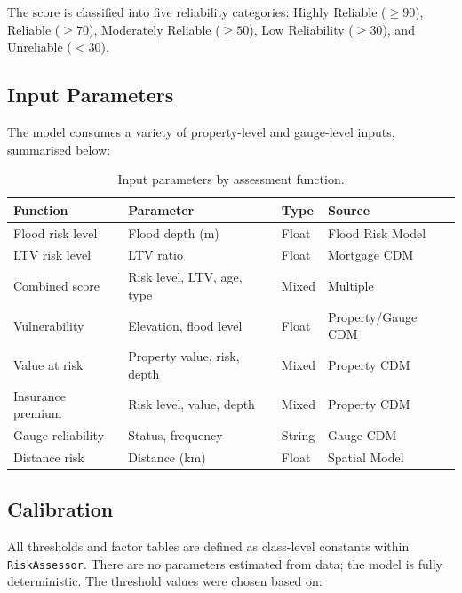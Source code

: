 \documentclass[11pt,a4paper]{article}
\begin{document}
\noindent The score is classified into five reliability categories: Highly Reliable ($\geq 90$), Reliable ($\geq 70$), Moderately Reliable ($\geq 50$), Low Reliability ($\geq 30$), and Unreliable ($< 30$).

\clearpage

\mkminputs

\subsection{Input Parameters}

The model consumes a variety of property-level and gauge-level inputs, summarised below:

\begin{table}[H]
\centering
\caption{Input parameters by assessment function.}
\label{tab:inputs}
\begin{tabular}{llll}
\toprule
\textbf{Function} & \textbf{Parameter} & \textbf{Type} & \textbf{Source} \\
\midrule
Flood risk level      & Flood depth (m)           & Float  & Flood Risk Model \\
LTV risk level        & LTV ratio                 & Float  & Mortgage CDM \\
Combined score        & Risk level, LTV, age, type & Mixed & Multiple \\
Vulnerability         & Elevation, flood level    & Float  & Property/Gauge CDM \\
Value at risk         & Property value, risk, depth & Mixed & Property CDM \\
Insurance premium     & Risk level, value, depth  & Mixed & Property CDM \\
Gauge reliability     & Status, frequency         & String & Gauge CDM \\
Distance risk         & Distance (km)             & Float  & Spatial Model \\
\bottomrule
\end{tabular}
\end{table}

\subsection{Calibration}

All thresholds and factor tables are defined as class-level constants within \texttt{RiskAssessor}. There are no parameters estimated from data; the model is fully deterministic. The threshold values were chosen based on:
\end{document}
